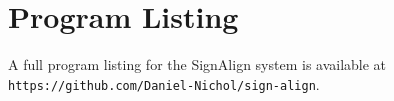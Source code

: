\section{Program Listing}
A full program listing for the SignAlign system is available at \\
\verb|https://github.com/Daniel-Nichol/sign-align|.
 

